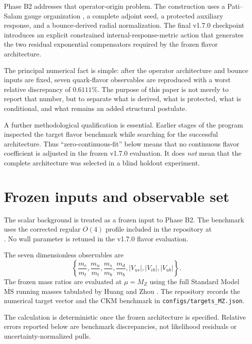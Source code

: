 \documentclass[11pt]{article}
\newcommand{\MSbar}{\overline{\mathrm{MS}}}
\begin{document}
Phase B2 addresses that operator-origin problem. The construction uses a Pati--Salam gauge organization \cite{PatiSalam1974}, a complete adjoint seed, a protected auxiliary response, and a bounce-derived radial normalization. The final v1.7.0 checkpoint introduces an explicit constrained internal-response-metric action that generates the two residual exponential compensators required by the frozen flavor architecture.

The principal numerical fact is simple: after the operator architecture and bounce inputs are fixed, seven quark-flavor observables are reproduced with a worst relative discrepancy of $0.6111\%$. The purpose of this paper is not merely to report that number, but to separate what is derived, what is protected, what is conditional, and what remains an added structural postulate.

A further methodological qualification is essential. Earlier stages of the program inspected the target flavor benchmark while searching for the successful architecture. Thus ``zero-continuous-fit'' below means that no continuous flavor coefficient is adjusted in the frozen v1.7.0 evaluation. It does \emph{not} mean that the complete architecture was selected in a blind holdout experiment.

\section{Frozen inputs and observable set}

The scalar background is treated as a frozen input to Phase B2. The benchmark uses the corrected regular $O(4)$ profile included in the repository at\\
.
No wall parameter is retuned in the v1.7.0 flavor evaluation.

The seven dimensionless observables are
\begin{equation}
\left\{
\frac{m_c}{m_t},\frac{m_u}{m_t},\frac{m_s}{m_b},\frac{m_d}{m_b},
|V_{us}|,|V_{cb}|,|V_{ub}|
\right\}.
\end{equation}
The frozen mass ratios are evaluated at $\mu=M_Z$ using the full Standard Model $\MSbar$ running masses tabulated by Huang and Zhou \cite{HuangZhou2021}. The repository records the numerical target vector and the CKM benchmark in \texttt{configs/targets\_MZ.json}.

The calculation is deterministic once the frozen architecture is specified. Relative errors reported below are benchmark discrepancies, not likelihood residuals or uncertainty-normalized pulls.
\end{document}
